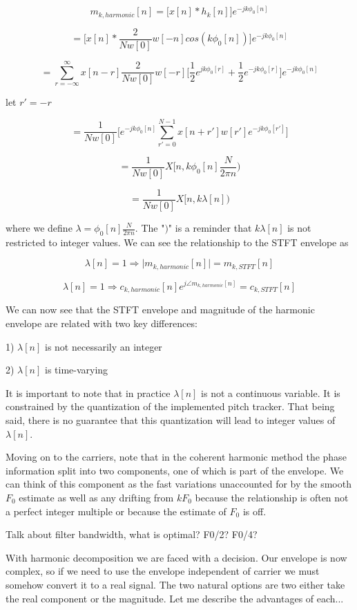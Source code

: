 \documentclass [11pt, proquest] {uwthesis}[2015/03/03]
\begin{document}
$$m_{k,harmonic}[n] = \bigg[ x[n] * h_k[n] \bigg] e^{-jk \phi_0[n]}$$


$$= \bigg[ x[n] * \frac{2}{Nw[0]}w[-n] cos( k \phi_0[n]) \bigg] e^{-jk \phi_0[n]}$$

$$= \sum_{r = -\infty}^\infty x[n - r] \frac{2}{Nw[0]}w[-r] \bigg[ \frac{1}{2} e^{jk \phi_0[r]} + \frac{1}{2} e^{-jk \phi_0[r]} \bigg] e^{-jk \phi_0[n]}$$

let $r' = -r$

$$= \frac{1}{Nw[0]} \bigg[ e^{-jk \phi_0[n]} \sum_{r' = 0}^{N-1} x[n + r'] w[r'] e^{-jk \phi_0[r']} \bigg]$$

$$= \frac{1}{Nw[0]} X[n, k \phi_0[n] \frac{N}{2\pi n})$$

$$= \frac{1}{Nw[0]} X[n, k\lambda[n])$$

where we define $\lambda = \phi_0[n] \frac{N}{2\pi n}$.  The "$)$" is a reminder that $k\lambda [n]$ is not restricted to integer values.  We can see the relationship to the STFT envelope as

$$\lambda[n] = 1 \Rightarrow \vert m_{k,harmonic}[n] \vert = m_{k,STFT}[n]$$

$$\lambda[n] = 1 \Rightarrow c_{k,harmonic}[n]e^{j \angle m_{k,harmonic}[n]} = c_{k,STFT}[n]$$


We can now see that the STFT envelope and magnitude of the harmonic envelope are related with two key differences:

1) $\lambda[n]$ is not necessarily an integer

2) $\lambda[n]$ is time-varying

It is important to note that in practice $\lambda[n]$ is not a continuous variable.  It is constrained by the quantization of the implemented pitch tracker.  That being said, there is no guarantee that this quantization will lead to integer values of $\lambda[n]$.

Moving on to the carriers, note that in the coherent harmonic method the phase information split into two components, one of which is part of the envelope.  We can think of this component as the fast variations unaccounted for by the smooth $F_0$ estimate as well as any drifting from $kF_0$ because the relationship is often not a perfect integer multiple or because the estimate of $F_0$ is off.





Talk about filter bandwidth, what is optimal? F0/2? F0/4?


With harmonic decomposition we are faced with a decision.  Our envelope is now complex, so if we need to use the envelope independent of carrier we must somehow convert it to a real signal.  The two natural options are two either take the real component or the magnitude.  Let me describe the advantages of each...
\end{document}
